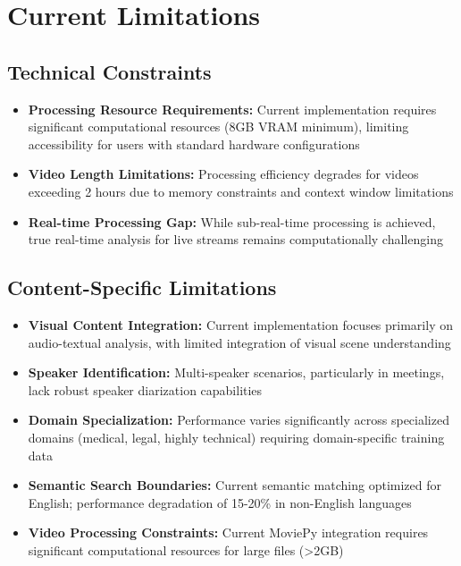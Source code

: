 \documentclass{bscs}
\begin{document}
\section{Current Limitations}

\subsection{Technical Constraints}

\begin{itemize}
\item \textbf{Processing Resource Requirements:} Current implementation requires significant computational resources (8GB VRAM minimum), limiting accessibility for users with standard hardware configurations
\item \textbf{Video Length Limitations:} Processing efficiency degrades for videos exceeding 2 hours due to memory constraints and context window limitations
\item \textbf{Real-time Processing Gap:} While sub-real-time processing is achieved, true real-time analysis for live streams remains computationally challenging
\end{itemize}

\subsection{Content-Specific Limitations}

\begin{itemize}
\item \textbf{Visual Content Integration:} Current implementation focuses primarily on audio-textual analysis, with limited integration of visual scene understanding
\item \textbf{Speaker Identification:} Multi-speaker scenarios, particularly in meetings, lack robust speaker diarization capabilities
\item \textbf{Domain Specialization:} Performance varies significantly across specialized domains (medical, legal, highly technical) requiring domain-specific training data
\item \textbf{Semantic Search Boundaries:} Current semantic matching optimized for English; performance degradation of 15-20\% in non-English languages
\item \textbf{Video Processing Constraints:} Current MoviePy integration requires significant computational resources for large files (>2GB)
\end{itemize}
\end{document}
